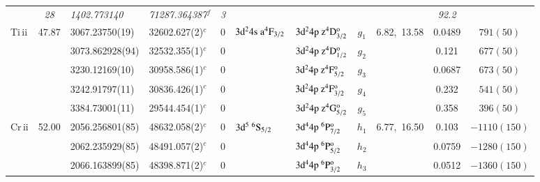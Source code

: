 \documentclass[useAMS,usenatbib]{mn2e}
\begin{document}
\begin{table*}
\begin{center}
\begin{minipage}{0.977\textwidth}
\begin{tabular}{lcllcllcccc}
              & \it{28}& \it{1402.773140}   & \it{71287.364387}$^f$    &\it{3}&                                            &                                                    &        &              &\it{92.2}& $          $\\
Ti{\sc \,ii}  & 47.87  & 3067.23750(19)     & 32602.627(2)$^c$         & 0    & $3\rm{d}^24\rm{s}~a^4\rm{F}_{3/2}$         & $3\rm{d}^24\rm{p~z}^4\rm{D}_{3/2}^{\rm{o}}$        & $g_1$  & 6.82,~13.58  &  0.0489 & $  791(50) $\\
              &        & 3073.862928(94)    & 32532.355(1)$^c$         & 0    &                                            & $3\rm{d}^24\rm{p~z}^4\rm{D}_{1/2}^{\rm{o}}$        & $g_2$  &              &  0.121  & $  677(50) $\\
              &        & 3230.12169(10)     & 30958.586(1)$^c$         & 0    &                                            & $3\rm{d}^24\rm{p~z}^4\rm{F}_{5/2}^{\rm{o}}$        & $g_3$  &              &  0.0687 & $  673(50) $\\
              &        & 3242.91797(11)     & 30836.426(1)$^c$         & 0    &                                            & $3\rm{d}^24\rm{p~z}^4\rm{F}_{3/2}^{\rm{o}}$        & $g_4$  &              &  0.232  & $  541(50) $\\
              &        & 3384.73001(11)     & 29544.454(1)$^c$         & 0    &                                            & $3\rm{d}^24\rm{p~z}^4\rm{G}_{5/2}^{\rm{o}}$        & $g_5$  &              &  0.358  & $  396(50) $\\
Cr{\sc \,ii}  & 52.00  & 2056.256801(85)    & 48632.058(2)$^c$         & 0    & $3\rm{d}^5~^6\rm{S}_{5/2}$                 & $3\rm{d}^44\rm{p}~^6\rm{P}_{7/2}^{\rm{o}}$         & $h_1$  & 6.77,~16.50  &  0.103  & $-1110(150)$\\
              &        & 2062.235929(85)    & 48491.057(2)$^c$         & 0    &                                            & $3\rm{d}^44\rm{p}~^6\rm{P}_{5/2}^{\rm{o}}$         & $h_2$  &              &  0.0759 & $-1280(150)$\\
              &        & 2066.163899(85)    & 48398.871(2)$^c$         & 0    &                                            & $3\rm{d}^44\rm{p}~^6\rm{P}_{3/2}^{\rm{o}}$         & $h_3$  &              &  0.0512 & $-1360(150)$
\end{tabular}
\end{minipage}
\end{center}
\end{table*}
\end{document}
